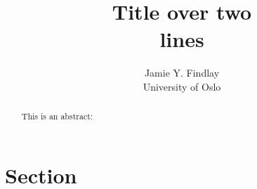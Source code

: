 \documentclass[
11pt,
draft,
a4paper
]{article}
\title{Title over two \\ lines}
\author{Jamie Y. Findlay\\\small University of Oslo\\\small\email{jamie.findlay@iln.uio.no}}
\date{}
\begin{document}
\maketitle

\begin{abstract}%
This is an abstract: \lipsum[1]
\end{abstract}

\section{Section}

\lipsum



\end{document}
